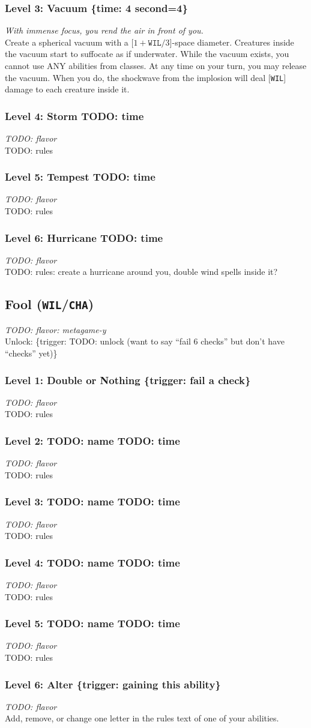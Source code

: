\documentclass[12pt]{article}
\newcommand{\WIL}{\texttt{WIL}}
\newcommand{\CHA}{\texttt{CHA}}
\newcommand{\TIME}[1]{\{time: #1 second\if1=#1{}\else{s}\fi\}}
\newcommand{\TRIG}[1]{\{trigger: #1\}}
\newcommand{\Class}[4]{\pagebreak\subsection{#1 (#2)}\label{#1}\textit{#3}\\[1mm]Unlock: \TRIG{#4}}
\newcommand{\Skill}[5]{\subsubsection{Level #1: #2 #3}\textit{#4}\\[1mm]#5}
\begin{document}
\Skill{3}{Vacuum}{\TIME{4}}
{With immense focus, you rend the air in front of you.}
{Create a spherical vacuum with a [$1 + \WIL / 3$]-space diameter. Creatures inside the vacuum start to suffocate as if underwater. While the vacuum exists, you cannot use ANY abilities from classes. At any time on your turn, you may release the vacuum. When you do, the shockwave from the implosion will deal [\WIL] damage to each creature inside it.}

\Skill{4}{Storm}{TODO: time}
{TODO: flavor}
{TODO: rules}

\Skill{5}{Tempest}{TODO: time}
{TODO: flavor}
{TODO: rules}

\Skill{6}{Hurricane}{TODO: time}
{TODO: flavor}
{TODO: rules: create a hurricane around you, double wind spells inside it?}

%

\Class{Fool}{\WIL/\CHA}
{TODO: flavor: metagame-y}
{TODO: unlock (want to say ``fail 6 checks'' but don't have ``checks'' yet)}

\Skill{1}{Double or Nothing}{\TRIG{fail a check}}
{TODO: flavor}
{TODO: rules}

\Skill{2}{TODO: name}{TODO: time}
{TODO: flavor}
{TODO: rules}

\Skill{3}{TODO: name}{TODO: time}
{TODO: flavor}
{TODO: rules}

\Skill{4}{TODO: name}{TODO: time}
{TODO: flavor}
{TODO: rules}

\Skill{5}{TODO: name}{TODO: time}
{TODO: flavor}
{TODO: rules}

\Skill{6}{Alter}{\TRIG{gaining this ability}}
{TODO: flavor}
{Add, remove, or change one letter in the rules text of one of your abilities.}
\end{document}
